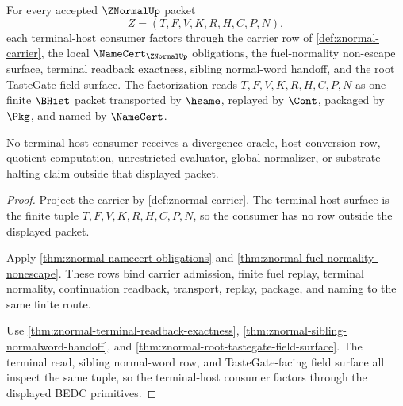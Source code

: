 \begin{theorem}
\label{thm:znormal-terminal-host-root-factorization}
For every accepted $\ZNormalUp$ packet
$$
Z=(T,F,V,K,R,H,C,P,N),
$$
each terminal-host consumer factors through the carrier row of \autoref{def:znormal-carrier}, the local $\NameCert_{\ZNormalUp}$ obligations, the fuel-normality non-escape surface, terminal readback exactness, sibling normal-word handoff, and the root TasteGate field surface. The factorization reads $T,F,V,K,R,H,C,P,N$ as one finite $\BHist$ packet transported by $\hsame$, replayed by $\Cont$, packaged by $\Pkg$, and named by $\NameCert$.

No terminal-host consumer receives a divergence oracle, host conversion row, quotient computation, unrestricted evaluator, global normalizer, or substrate-halting claim outside that displayed packet.
\end{theorem}
\begin{proof}
Project the carrier by \autoref{def:znormal-carrier}. The terminal-host surface is the finite tuple $T,F,V,K,R,H,C,P,N$, so the consumer has no row outside the displayed packet.

Apply \autoref{thm:znormal-namecert-obligations} and \autoref{thm:znormal-fuel-normality-nonescape}. These rows bind carrier admission, finite fuel replay, terminal normality, continuation readback, transport, replay, package, and naming to the same finite route.

Use \autoref{thm:znormal-terminal-readback-exactness}, \autoref{thm:znormal-sibling-normalword-handoff}, and \autoref{thm:znormal-root-tastegate-field-surface}. The terminal read, sibling normal-word row, and TasteGate-facing field surface all inspect the same tuple, so the terminal-host consumer factors through the displayed BEDC primitives.
\end{proof}

